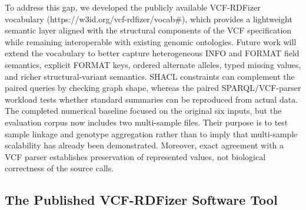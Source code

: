 \documentclass[pdflatex,sn-mathphys-num]{sn-jnl}%
\newenvironment{revision}{\begingroup\color{revisionblue}}{\endgroup}%
\theoremstyle{thmstyleone}%
\theoremstyle{thmstyletwo}%
\theoremstyle{thmstylethree}%
\begin{document}
To address this gap, we developed the publicly available VCF-RDFizer vocabulary (https://w3id.org/vcf-rdfizer/vocab\#), which provides a lightweight semantic layer aligned with the structural components of the VCF specification while remaining interoperable with existing genomic ontologies. 
\begin{revision}
Future work will extend the vocabulary to better capture heterogeneous INFO and FORMAT field semantics, explicit FORMAT keys, ordered alternate alleles, typed missing values, and richer structural-variant semantics. SHACL constraints can complement the paired queries by checking graph shape, whereas the paired SPARQL/VCF-parser workload tests whether standard summaries can be reproduced from actual data.
The completed numerical baseline focused on the original six inputs, but the evaluation corpus now includes two multi-sample files. Their purpose is to test sample linkage and genotype aggregation rather than to imply that multi-sample scalability has already been demonstrated. Moreover, exact agreement with a VCF parser establishes preservation of represented values, not biological correctness of the source calls.
\end{revision}


\subsection{The Published VCF-RDFizer Software Tool}\label{subsec4.2}
\end{document}
